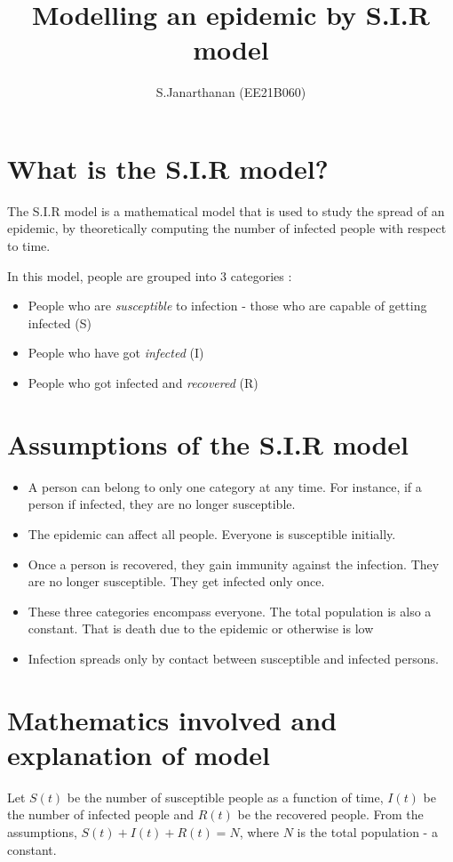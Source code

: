 \documentclass{article}
\title{Modelling an epidemic by S.I.R model}
\author{S.Janarthanan (EE21B060)}
\date{}
\begin{document}
\maketitle
\section*{What is the S.I.R model?}
The S.I.R model is a mathematical model that is used to study the spread of an epidemic, by theoretically computing the number of infected people with respect to time.



In this model, people are grouped into 3 categories :
\begin{itemize}
    \item People who are \emph{susceptible} to infection - those who are capable of getting infected (S)
    \item People who have got \emph{infected} (I)
    \item People who got infected and \emph{recovered} (R)
\end{itemize}


\section*{Assumptions of the S.I.R model}
\begin{itemize}
    \item A person can belong to only one category at any time. For instance, if a person if infected, they are no longer susceptible.
    \item  The epidemic can affect all people. Everyone is susceptible initially.
    \item Once a person is recovered, they gain immunity against the infection. They are no longer susceptible. They get infected only once.
    \item These three categories encompass everyone. The total population is also a constant. That is death due to the epidemic or otherwise is low
    \item Infection spreads only by contact between susceptible and infected persons.
\end{itemize}    
\section*{Mathematics involved and explanation of model} 
Let $S(t)$ be the number of susceptible people as a function of time, $I(t)$ be the number of infected people and $R(t)$ be the recovered people. From the assumptions, $S(t) + I(t) + R(t) = N$, where $N$ is the total population - a constant.
\end{document}
